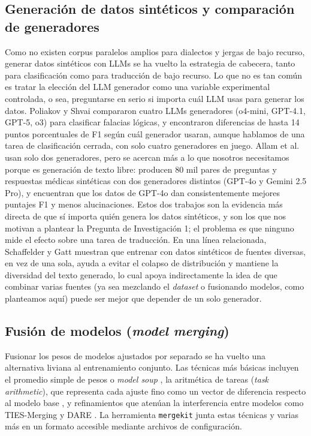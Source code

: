 \documentclass[11pt,a4paper]{article}
\begin{document}
\subsection{Generación de datos sintéticos y comparación de generadores}

Como no existen corpus paralelos amplios para dialectos y jergas de bajo recurso, generar datos sintéticos con LLMs se ha vuelto la estrategia de cabecera, tanto para clasificación como para traducción de bajo recurso. Lo que no es tan común es tratar la elección del LLM generador como una variable experimental controlada, o sea, preguntarse en serio si importa cuál LLM usas para generar los datos. Poliakov y Shvai \cite{poliakov2025missynth} compararon cuatro LLMs generadores (o4-mini, GPT-4.1, GPT-5, o3) para clasificar falacias lógicas, y encontraron diferencias de hasta 14 puntos porcentuales de F1 según cuál generador usaran, aunque hablamos de una tarea de clasificación cerrada, con solo cuatro generadores en juego. Allam et al. \cite{allam2025arabic} usan solo dos generadores, pero se acercan más a lo que nosotros necesitamos porque es generación de texto libre: producen 80 mil pares de preguntas y respuestas médicas sintéticas con dos generadores distintos (GPT-4o y Gemini 2.5 Pro), y encuentran que los datos de GPT-4o dan consistentemente mejores puntajes F1 y menos alucinaciones. Estos dos trabajos son la evidencia más directa de que sí importa quién genera los datos sintéticos, y son los que nos motivan a plantear la Pregunta de Investigación 1; el problema es que ninguno mide el efecto sobre una tarea de traducción. En una línea relacionada, Schaffelder y Gatt \cite{schaffelder2026eggs} muestran que entrenar con datos sintéticos de fuentes diversas, en vez de una sola, ayuda a evitar el colapso de distribución y mantiene la diversidad del texto generado, lo cual apoya indirectamente la idea de que combinar varias fuentes (ya sea mezclando el \textit{dataset} o fusionando modelos, como planteamos aquí) puede ser mejor que depender de un solo generador.

\subsection{Fusión de modelos (\textit{model merging})}

Fusionar los pesos de modelos ajustados por separado se ha vuelto una alternativa liviana al entrenamiento conjunto. Las técnicas más básicas incluyen el promedio simple de pesos o \textit{model soup} \cite{wortsman2022soups}, la aritmética de tareas (\textit{task arithmetic}), que representa cada ajuste fino como un vector de diferencia respecto al modelo base \cite{ilharco2022taskarithmetic}, y refinamientos que atenúan la interferencia entre modelos como TIES-Merging \cite{yadav2023ties} y DARE \cite{yu2024dare}. La herramienta \texttt{mergekit} \cite{goddard2024mergekit} junta estas técnicas y varias más en un formato accesible mediante archivos de configuración.
\end{document}
